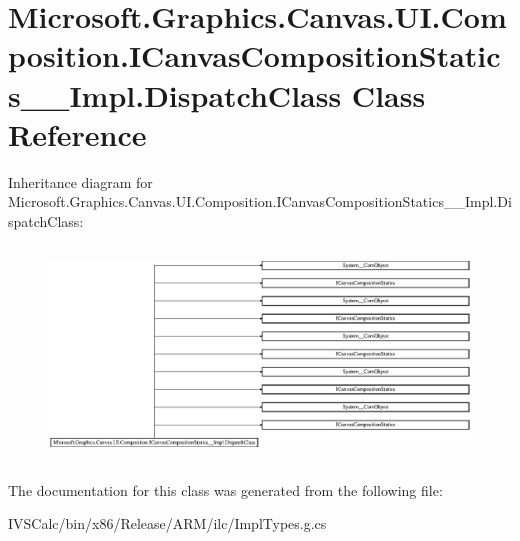 \hypertarget{class_microsoft_1_1_graphics_1_1_canvas_1_1_u_i_1_1_composition_1_1_i_canvas_composition_statics_____impl_1_1_dispatch_class}{}\section{Microsoft.\+Graphics.\+Canvas.\+U\+I.\+Composition.\+I\+Canvas\+Composition\+Statics\+\_\+\+\_\+\+Impl.\+Dispatch\+Class Class Reference}
\label{class_microsoft_1_1_graphics_1_1_canvas_1_1_u_i_1_1_composition_1_1_i_canvas_composition_statics_____impl_1_1_dispatch_class}
Inheritance diagram for Microsoft.\+Graphics.\+Canvas.\+U\+I.\+Composition.\+I\+Canvas\+Composition\+Statics\+\_\+\+\_\+\+Impl.\+Dispatch\+Class\+:\begin{figure}[H]
\begin{center}
\leavevmode
\includegraphics[height=5.735568cm]{class_microsoft_1_1_graphics_1_1_canvas_1_1_u_i_1_1_composition_1_1_i_canvas_composition_statics_____impl_1_1_dispatch_class}
\end{center}
\end{figure}


The documentation for this class was generated from the following file\+:\begin{DoxyCompactItemize}
\item 
I\+V\+S\+Calc/bin/x86/\+Release/\+A\+R\+M/ilc/Impl\+Types.\+g.\+cs\end{DoxyCompactItemize}
